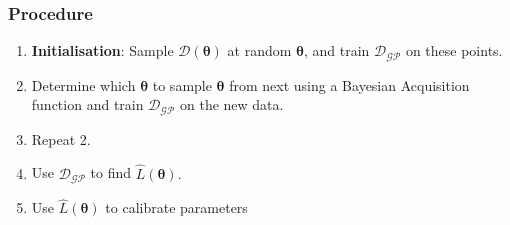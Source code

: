 \documentclass{beamer}
\begin{document}

\begin{frame}
    \frametitle{Procedure}

    \begin{enumerate}
        \item \textbf{Initialisation}: Sample $\mathcal{D}(\bm{\theta})$ at 
        random $\bm{\theta}$, and train $\mathcal{D}_\mathcal{GP}$ on these 
        points.
        \item <2-> Determine which $\bm{\theta}$ to sample $\mathcal{\bm{\theta}}$ 
        from next using a Bayesian Acquisition function and train 
        $\mathcal{D}_\mathcal{GP}$ on the new data.
        \item <2-> Repeat 2.
        \item <3-> Use $\mathcal{D}_\mathcal{GP}$ to find $\hat{L}(\bm{\theta}).$
        \item <4-> Use $\hat{L}(\bm{\theta})$ to calibrate parameters
    \end{enumerate}

\end{frame}
\end{document}
